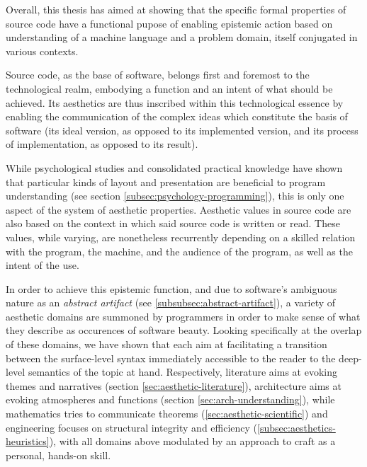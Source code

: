 Overall, this thesis has aimed at showing that the specific formal properties of source code have a functional pupose of enabling epistemic action based on understanding of a machine language and a problem domain, itself conjugated in various contexts.

Source code, as the base of software, belongs first and foremost to the technological realm, embodying a function and an intent of what should be achieved. Its aesthetics are thus inscribed within this technological essence by enabling the communication of the complex ideas which constitute the basis of software (its ideal version, as opposed to its implemented version, and its process of implementation, as opposed to its result).

While psychological studies and consolidated practical knowledge have shown that particular kinds of layout and presentation are beneficial to program understanding (see section \ref{subsec:psychology-programming}), this is only one aspect of the system of aesthetic properties. Aesthetic values in source code are also based on the context in which said source code is written or read. These values, while varying, are nonetheless recurrently depending on a skilled relation with the program, the machine, and the audience of the program, as well as the intent of the use.

In order to achieve this epistemic function, and due to software's ambiguous nature as an \emph{abstract artifact} (see \ref{subsubsec:abstract-artifact}), a variety of aesthetic domains are summoned by programmers in order to make sense of what they describe as occurences of software beauty. Looking specifically at the overlap of these domains, we have shown that each aim at facilitating a transition between the surface-level syntax immediately accessible to the reader to the deep-level semantics of the topic at hand. Respectively, literature aims at evoking themes and narratives (section \ref{sec:aesthetic-literature}), architecture aims at evoking atmospheres and functions (section \ref{sec:arch-understanding}), while mathematics tries to communicate theorems (\ref{sec:aesthetic-scientific}) and engineering focuses on structural integrity and efficiency (\ref{subsec:aesthetics-heuristics}), with all domains above modulated by an approach to craft as a personal, hands-on skill.

